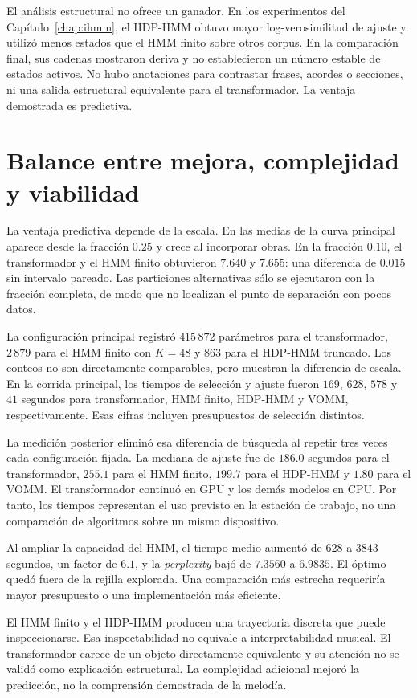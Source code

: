 El análisis estructural no ofrece un ganador. En los experimentos del Capítulo~\ref{chap:ihmm}, el HDP-HMM obtuvo mayor log-verosimilitud de ajuste y utilizó menos estados que el HMM finito sobre otros corpus. En la comparación final, sus cadenas mostraron deriva y no establecieron un número estable de estados activos. No hubo anotaciones para contrastar frases, acordes o secciones, ni una salida estructural equivalente para el transformador. La ventaja demostrada es predictiva.

\section{Balance entre mejora, complejidad y viabilidad}

La ventaja predictiva depende de la escala. En las medias de la curva principal aparece desde la fracción $0.25$ y crece al incorporar obras. En la fracción $0.10$, el transformador y el HMM finito obtuvieron $7.640$ y $7.655$: una diferencia de $0.015$ sin intervalo pareado. Las particiones alternativas sólo se ejecutaron con la fracción completa, de modo que no localizan el punto de separación con pocos datos.

La configuración principal registró $415\,872$ parámetros para el transformador, $2\,879$ para el HMM finito con $K=48$ y $863$ para el HDP-HMM truncado. Los conteos no son directamente comparables, pero muestran la diferencia de escala. En la corrida principal, los tiempos de selección y ajuste fueron $169$, $628$, $578$ y $41$ segundos para transformador, HMM finito, HDP-HMM y VOMM, respectivamente. Esas cifras incluyen presupuestos de selección distintos.

La medición posterior eliminó esa diferencia de búsqueda al repetir tres veces cada configuración fijada. La mediana de ajuste fue de $186.0$ segundos para el transformador, $255.1$ para el HMM finito, $199.7$ para el HDP-HMM y $1.80$ para el VOMM. El transformador continuó en GPU y los demás modelos en CPU. Por tanto, los tiempos representan el uso previsto en la estación de trabajo, no una comparación de algoritmos sobre un mismo dispositivo.

Al ampliar la capacidad del HMM, el tiempo medio aumentó de $628$ a $3843$ segundos, un factor de $6.1$, y la \emph{perplexity} bajó de $7.3560$ a $6.9835$. El óptimo quedó fuera de la rejilla explorada. Una comparación más estrecha requeriría mayor presupuesto o una implementación más eficiente.

El HMM finito y el HDP-HMM producen una trayectoria discreta que puede inspeccionarse. Esa inspectabilidad no equivale a interpretabilidad musical. El transformador carece de un objeto directamente equivalente y su atención no se validó como explicación estructural. La complejidad adicional mejoró la predicción, no la comprensión demostrada de la melodía.

